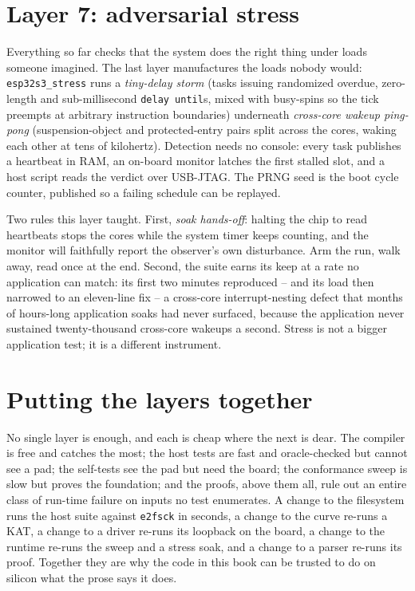 \section{Layer 7: adversarial stress}

Everything so far checks that the system does the right thing under loads
someone imagined.  The last layer manufactures the loads nobody would:
\texttt{esp32s3\_stress} runs a \emph{tiny-delay storm} (tasks issuing
randomized overdue, zero-length and sub-millisecond \texttt{delay until}s,
mixed with busy-spins so the tick preempts at arbitrary instruction
boundaries) underneath \emph{cross-core wakeup ping-pong} (suspension-object
and protected-entry pairs split across the cores, waking each other at tens
of kilohertz).  Detection needs no console: every task publishes a heartbeat
in RAM, an on-board monitor latches the first stalled slot, and a host
script reads the verdict over USB-JTAG.  The PRNG seed is the boot cycle
counter, published so a failing schedule can be replayed.

Two rules this layer taught.  First, \emph{soak hands-off}: halting the
chip to read heartbeats stops the cores while the system timer keeps
counting, and the monitor will faithfully report the observer's own
disturbance.  Arm the run, walk away, read once at the end.  Second, the
suite earns its keep at a rate no application can match: its first two
minutes reproduced -- and its load then narrowed to an eleven-line fix -- a
cross-core interrupt-nesting defect that months of hours-long application
soaks had never surfaced, because the application never sustained
twenty-thousand cross-core wakeups a second.  Stress is not a bigger
application test; it is a different instrument.

\section{Putting the layers together}

No single layer is enough, and each is cheap where the next is dear. The compiler is
free and catches the most; the host tests are fast and oracle-checked but cannot see
a pad; the self-tests see the pad but need the board; the conformance sweep is slow
but proves the foundation; and the proofs, above them all, rule out an entire class of
run-time failure on inputs no test enumerates. A change to the filesystem runs the host
suite against \texttt{e2fsck} in seconds, a change to the curve re-runs a KAT, a change
to a driver re-runs its loopback on the board, a change to the runtime re-runs the
sweep and a stress soak, and a change to a parser re-runs its proof. Together they are why the code in
this book can be trusted to do on silicon what the prose says it does.
